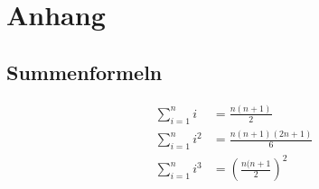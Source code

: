 
\section{Anhang}
\subsection{Summenformeln}
\[ \begin{aligned}
 \sum_{i=1}^{n}i     & = \frac{n(n+1)}{2} \\
 \sum_{i=1}^{n}i^2   & = \frac{n(n+1)(2n+1)}{6} \\
 \sum_{i=1}^{n}i^3   & = \left(\frac{n(n+1}{2}\right)^2 \\
\end{aligned} \]
